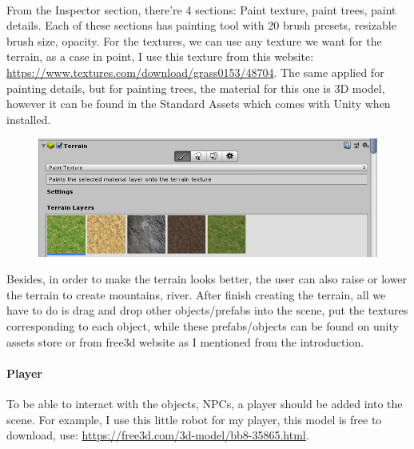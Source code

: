 \documentclass[a4paper, 13pt]{extarticle}
\begin{document}
 	  \\[0.15cm]
 	  From the Inspector section, there're 4 sections: Paint texture, paint trees, paint details. Each of these sections has painting tool with 20 brush presets, resizable brush size, opacity. For the textures, we can use any texture we want for the terrain, as a case in point, I use this texture from this website: \href{https://www.textures.com/download/grass0153/48704}{https://www.textures.com/download/grass0153/48704}. The same applied for painting details, but for painting trees, the material for this one is 3D model, however it can be found in the Standard Assets which comes with Unity when installed. 
 	   \begin{figure}[h]
 	   	 \centering
 	   	 \begin{minipage}{1\textwidth}
 	   	 	\centering
 	   	 	\includegraphics[width=0.75\linewidth]{intructions/3.png}
 	   	 	\label{fig:test4}
 	   	 \end{minipage}
 		 \end{figure}  
 		 
 	Besides, in order to make the terrain looks better, the user can also raise or lower the terrain to create mountains, river. After finish creating the terrain, all we have to do is drag and drop other objects/prefabs into the scene, put the textures corresponding to each object, while these prefabs/objects can be found on unity assets store or from free3d website as I mentioned from the introduction. 
 	 \paragraph{Player}
 	 To be able to interact with the objects, NPCs, a player should be added into the scene. For example, I use this little robot for my player, this model is free to download, use: \href{https://free3d.com/3d-model/bb8-35865.html}{https://free3d.com/3d-model/bb8-35865.html}.
 	 
\end{document}

